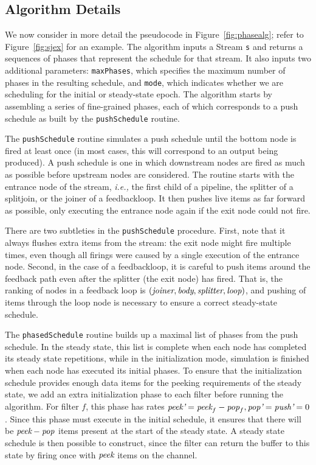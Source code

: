 \subsection{Algorithm Details}



We now consider in more detail the pseudocode in
Figure~\ref{fig:phasealg}; refer to Figure~\ref{fig:sjex} for an
example.  The algorithm inputs a Stream {\tt s} and returns a
sequences of phases that represent the schedule for that stream.  It
also inputs two additional parameters: {\tt maxPhases}, which
specifies the maximum number of phases in the resulting schedule, and
{\tt mode}, which indicates whether we are scheduling for the initial
or steady-state epoch.  The algorithm starts by assembling a series of
fine-grained phases, each of which corresponds to a push schedule as
built by the {\tt pushSchedule} routine.

The {\tt pushSchedule} routine simulates a push schedule until the
bottom node is fired at least once (in most cases, this will
correspond to an output being produced).  A push schedule is one in
which downstream nodes are fired as much as possible before upstream
nodes are considered.  The routine starts with the entrance node of
the stream, {\it i.e.,} the first child of a pipeline, the splitter of
a splitjoin, or the joiner of a feedbackloop.  It then pushes live
items as far forward as possible, only executing the entrance node
again if the exit node could not fire.

There are two subtleties in the {\tt pushSchedule} procedure.  First,
note that it always flushes extra items from the stream: the exit node
might fire multiple times, even though all firings were caused by a
single execution of the entrance node.  Second, in the case of a
feedbackloop, it is careful to push items around the feedback path
even after the splitter (the exit node) has fired.  That is, the
ranking of nodes in a feedback loop is $(\mbox{\it joiner}, \mbox{\it body},
\mbox{\it splitter}, \mbox{\it loop})$, and pushing of items through the loop node
is necessary to ensure a correct steady-state schedule.

The {\tt phasedSchedule} routine builds up a maximal list of phases
from the push schedule.  In the steady state, this list is complete
when each node has completed its steady state repetitions, while in
the initialization mode, simulation is finished when each node has
executed its initial phases.  To ensure that the initialization
schedule provides enough data items for the peeking requirements of
the steady state, we add an extra initialization phase to each filter
before running the algorithm.  For filter $f$, this phase has rates
$\mbox{\it peek'}=\mbox{\it peek}_f - \mbox{\it pop}_f, \mbox{\it pop'}=\mbox{\it push'}=0$.  Since
this phase must execute in the initial schedule, it ensures that there
will be $\mbox{\it peek}-\mbox{\it pop}$ items present at the start of the steady
state.  A steady state schedule is then possible to construct, since
the filter can return the buffer to this state by firing once with
$\mbox{\it peek}$ items on the channel.


